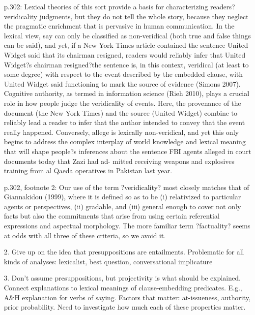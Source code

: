 \documentclass[11pt,fleqn]{article}
\newcommand{\6}{\mbox{$[\hspace*{-.6mm}[$}}
\newcommand{\9}{\mbox{$]\hspace*{-.6mm}]$}}
\begin{document}
{\begin{itemize}
p.302: Lexical theories of this sort provide a basis for characterizing readers? veridicality judgments, but they do not tell the whole story, because they neglect the pragmatic enrichment that is pervasive in human communication. In the lexical view, say can only be classified as non-veridical (both true and false things can be said), and yet, if a New York Times article contained the sentence United Widget said that its chairman resigned, readers would reliably infer that United Widget?s chairman resigned?the sentence is, in this context, veridical (at least to some degree) with respect to the event described by the embedded clause, with United Widget said functioning to mark the source of evidence (Simons 2007). Cognitive authority, as termed in information science (Rieh 2010), plays a crucial role in how people judge the veridicality of events. Here, the provenance of the document (the New York Times) and the source (United Widget) combine to reliably lead a reader to infer that the author intended to convey that the event really happened. Conversely, allege is lexically non-veridical, and yet this only begins to address the complex interplay of world knowledge and lexical meaning that will shape people?s inferences about the sentence FBI agents alleged in court documents today that Zazi had ad- mitted receiving weapons and explosives training from al Qaeda operatives in Pakistan last year.

p.302, footnote 2: Our use of the term ?veridicality? most closely matches that of Giannakidou (1999), where it is defined so as to be (i) relativized to particular agents or perspectives, (ii) gradable, and (iii) general enough to cover not only facts but also the commitments that arise from using certain referential expressions and aspectual morphology. The more familiar term ?factuality? seems at odds with all three of these criteria, so we avoid it.



2. Give up on the idea that presuppositions are entailments. Problematic for all kinds of analyses: lexicalist, best question, conversational implicature

3. Don't assume presuppositions, but projectivity is what should be explained. Connect explanations to lexical meanings of clause-embedding predicates. E.g., A\&H explanation for verbs of saying. Factors that matter: at-issueness, authority, prior probability. Need to investigate how much each of these properties matter.

\newpage



\end{itemize}}
\end{document}

